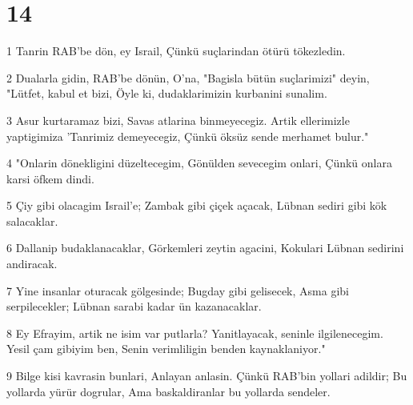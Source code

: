 \chapter{14}

\par 1 Tanrin RAB'be dön, ey Israil, Çünkü suçlarindan ötürü tökezledin.
\par 2 Dualarla gidin, RAB'be dönün, O'na, "Bagisla bütün suçlarimizi" deyin, "Lütfet, kabul et bizi, Öyle ki, dudaklarimizin kurbanini sunalim.
\par 3 Asur kurtaramaz bizi, Savas atlarina binmeyecegiz. Artik ellerimizle yaptigimiza 'Tanrimiz demeyecegiz, Çünkü öksüz sende merhamet bulur."
\par 4 "Onlarin dönekligini düzeltecegim, Gönülden sevecegim onlari, Çünkü onlara karsi öfkem dindi.
\par 5 Çiy gibi olacagim Israil'e; Zambak gibi çiçek açacak, Lübnan sediri gibi kök salacaklar.
\par 6 Dallanip budaklanacaklar, Görkemleri zeytin agacini, Kokulari Lübnan sedirini andiracak.
\par 7 Yine insanlar oturacak gölgesinde; Bugday gibi gelisecek, Asma gibi serpilecekler; Lübnan sarabi kadar ün kazanacaklar.
\par 8 Ey Efrayim, artik ne isim var putlarla? Yanitlayacak, seninle ilgilenecegim. Yesil çam gibiyim ben, Senin verimliligin benden kaynaklaniyor."
\par 9 Bilge kisi kavrasin bunlari, Anlayan anlasin. Çünkü RAB'bin yollari adildir; Bu yollarda yürür dogrular, Ama baskaldiranlar bu yollarda sendeler.



